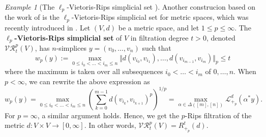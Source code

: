 \documentclass[a4paper,11pt]{article}
\newcounter{dummy}\numberwithin{dummy}{section}
\theoremstyle{remark}
\newtheorem{example}[dummy]{Example}
\begin{document}
\begin{example}[The $\ell_p$-Vietoris-Rips simplicial set {\cite{ivanov2024ell_p}}]\label{ex:recovering_ell_p_vietoris_rips} Another construcion based on the work of \cite{cho} is the $\ell_p$-Vietoris-Rips simplicial set for metric spaces, which was recently introduced in \cite{ivanov2024ell_p}. Let $(V,d)$ be a metric space, and let $1\leq p\leq\infty$. The \textbf{$\ell_p$-Vietoris-Rips simplicial set} of $V$ in filtration degree $t>0$, denoted $\mathcal{VR}^p_{t}(V)$, has $n$-simplices $y=(v_0,\ldots,v_n)$ such that
\begin{equation*}
    w_p(y):=\max_{0\leq i_0<\dots<i_m\leq n}\Vert d(v_{i_0},v_{i_{1}}),\ldots,d(v_{i_{m-1}},v_{i_{m}})\Vert_p\leq t
\end{equation*}
where the maximum is taken over all subsequences $i_0<\dots<i_m$ of $0,\ldots,n$. When $p<\infty$, we can rewrite the above expression as
\begin{equation*}
w_p(y) = \max_{0\leq i_0<\dots<i_m\leq n}\left(\sum_{k=0}^{m-1} d(v_{i_k},v_{i_{k+1}})^p\right)^{1/p} = \max_{\alpha\in\Delta([m],[n])}\mathcal{L}^d_{+_p}(\alpha^*y).
\end{equation*}
For $p=\infty$, a similar argument holds. Hence, we get the $p$-Rips filtration of the metric $d\colon V\times V\to [0,\infty]$. In other words, $\mathcal{VR}^p_{t}(V)= R_{+_p}^t(d)$.
\end{example}
\end{document}

